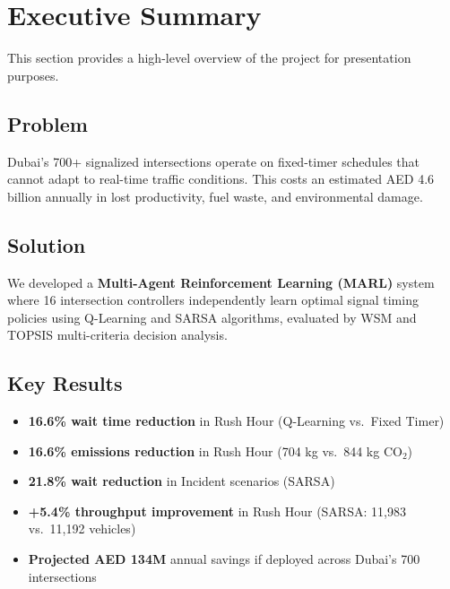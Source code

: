 \documentclass[12pt, a4paper]{article}
\begin{document}
\newpage
\tableofcontents
\newpage

\section{Executive Summary}

This section provides a high-level overview of the project for presentation purposes.

\subsection{Problem}
Dubai's 700+ signalized intersections operate on fixed-timer schedules that cannot adapt to real-time traffic conditions. This costs an estimated AED 4.6 billion annually in lost productivity, fuel waste, and environmental damage.

\subsection{Solution}
We developed a \textbf{Multi-Agent Reinforcement Learning (MARL)} system where 16 intersection controllers independently learn optimal signal timing policies using Q-Learning and SARSA algorithms, evaluated by WSM and TOPSIS multi-criteria decision analysis.

\subsection{Key Results}
\begin{itemize}[nosep]
    \item \textbf{16.6\% wait time reduction} in Rush Hour (Q-Learning vs.~Fixed Timer)
    \item \textbf{16.6\% emissions reduction} in Rush Hour (704 kg vs.~844 kg CO$_2$)
    \item \textbf{21.8\% wait reduction} in Incident scenarios (SARSA)
    \item \textbf{+5.4\% throughput improvement} in Rush Hour (SARSA: 11,983 vs.~11,192 vehicles)
    \item \textbf{Projected AED 134M} annual savings if deployed across Dubai's 700 intersections
\end{itemize}
\end{document}

